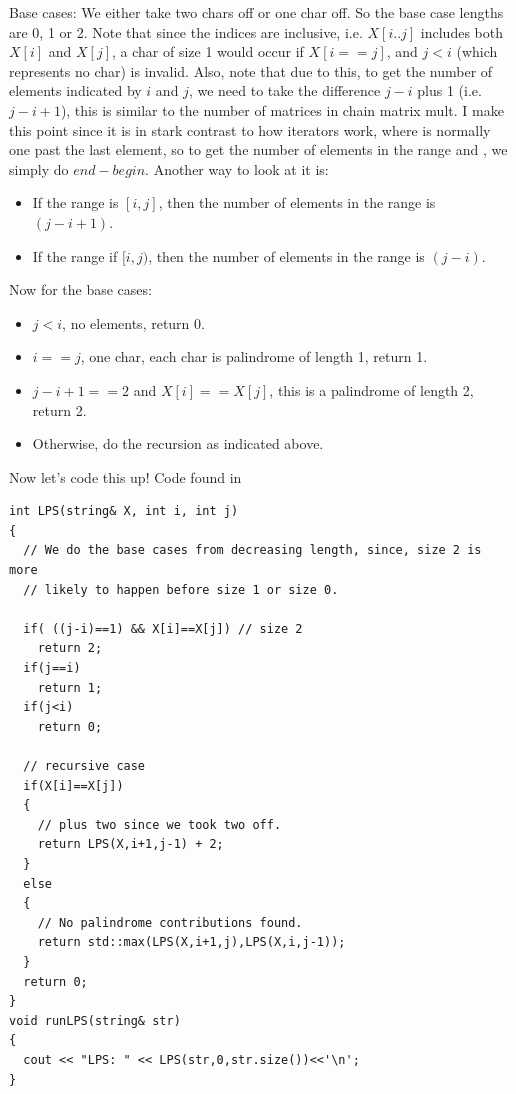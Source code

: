 Base cases: We either take two chars off or one char off. So the base case
lengths are 0, 1 or 2. Note that since the indices are inclusive, i.e.
$X[i..j]$ includes both $X[i]$ and $X[j]$, a char of size 1 would occur if
$X[i==j]$, and $j<i$ (which represents no char) is invalid. Also, note that
due to this, to get the number of elements indicated by $i$ and $j$, we need
to take the difference $j-i$ plus 1 (i.e. $j-i+1$), this is similar to the
number of matrices in chain matrix mult. I make this point since it is in
stark contrast to how iterators work, where  is normally one past
the last element, so to get the number of elements in the range
 and , we simply do $end-begin$. Another way to look
at it is:
\begin{itemize}[noitemsep,topsep=0pt]
\item If the range is $[i,j]$, then the number of elements in the range is
  $(j-i+1)$.
\item If the range if $[i,j)$, then the number of elements in the range is
  $(j-i)$.
\end{itemize}
Now for the base cases:
\begin{itemize}[noitemsep,topsep=0pt]
\item $j<i$, no elements, return 0.
\item $i==j$, one char, each char is  palindrome of length 1, return 1.
\item $j-i+1==2$ and $X[i]==X[j]$, this is a palindrome of length 2, return
  2.
\item Otherwise, do the recursion as indicated above.
\end{itemize}
Now let's code this up! Code found in\\
\begin{lstlisting}[style=raycppnewsnippet]
int LPS(string& X, int i, int j)
{
  // We do the base cases from decreasing length, since, size 2 is more 
  // likely to happen before size 1 or size 0.
  
  if( ((j-i)==1) && X[i]==X[j]) // size 2
    return 2;
  if(j==i)
    return 1;
  if(j<i)
    return 0;

  // recursive case
  if(X[i]==X[j])
  {
    // plus two since we took two off.
    return LPS(X,i+1,j-1) + 2;
  }
  else
  {
    // No palindrome contributions found.
    return std::max(LPS(X,i+1,j),LPS(X,i,j-1));
  }
  return 0;
}
void runLPS(string& str)
{
  cout << "LPS: " << LPS(str,0,str.size())<<'\n';
}
\end{lstlisting}
